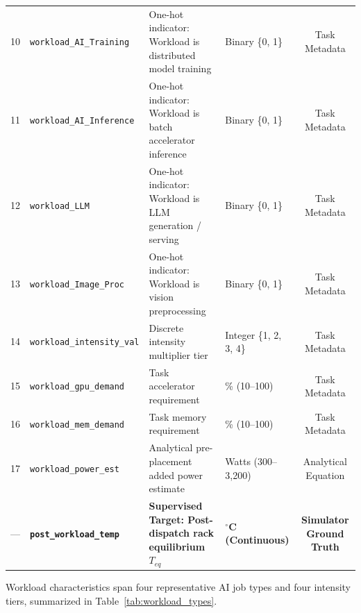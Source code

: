 \documentclass[conference,10pt]{IEEEtran}
\begin{document}
\begin{table}[t]
{\begin{tabular}{clllc}
10 & \texttt{workload\_AI\_Training} & One-hot indicator: Workload is distributed model training & Binary \{0, 1\} & Task Metadata \\
11 & \texttt{workload\_AI\_Inference} & One-hot indicator: Workload is batch accelerator inference & Binary \{0, 1\} & Task Metadata \\
12 & \texttt{workload\_LLM} & One-hot indicator: Workload is LLM generation / serving & Binary \{0, 1\} & Task Metadata \\
13 & \texttt{workload\_Image\_Proc} & One-hot indicator: Workload is vision preprocessing & Binary \{0, 1\} & Task Metadata \\
14 & \texttt{workload\_intensity\_val} & Discrete intensity multiplier tier & Integer \{1, 2, 3, 4\} & Task Metadata \\
15 & \texttt{workload\_gpu\_demand} & Task accelerator requirement & \% (10--100) & Task Metadata \\
16 & \texttt{workload\_mem\_demand} & Task memory requirement & \% (10--100) & Task Metadata \\
17 & \texttt{workload\_power\_est} & Analytical pre-placement added power estimate & Watts (300--3,200) & Analytical Equation \\
\midrule
--- & \textbf{\texttt{post\_workload\_temp}} & \textbf{Supervised Target: Post-dispatch rack equilibrium $T_{eq}$} & \textbf{$^\circ$C (Continuous)} & \textbf{Simulator Ground Truth} \\
\bottomrule
\end{tabular}%
}
\end{table}

Workload characteristics span four representative AI job types and four intensity tiers, summarized in Table~\ref{tab:workload_types}.

\begin{table}[htbp]
\caption{Workload Characterization and Demand Profiles}
\label{tab:workload_types}
\centering
{}
\end{table}
\end{document}
